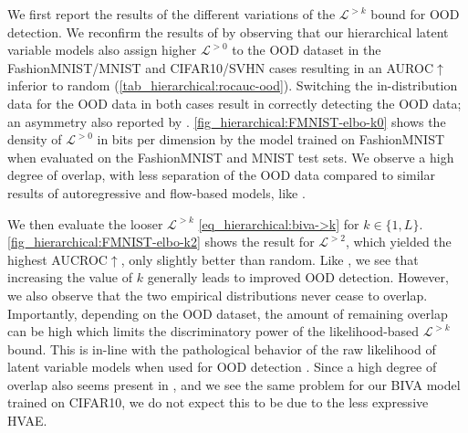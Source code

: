 {We first report the results of the different variations of the $\mathcal{L}^{>k}$ bound for OOD detection. 
We reconfirm the results of \textcite{nalisnick_deep_2019} by observing that our hierarchical latent variable models also assign higher $\mathcal{L}^{>0}$ to the OOD dataset in the FashionMNIST/MNIST and CIFAR10/SVHN cases resulting in an AUROC$\uparrow$ inferior to random (\cref{tab_hierarchical:rocauc-ood}).
Switching the in-distribution data for the OOD data in both cases result in correctly detecting the OOD data; an asymmetry also reported by \textcite{nalisnick_deep_2019}.
\cref{fig_hierarchical:FMNIST-elbo-k0} shows the density of $\mathcal{L}^{>0}$ in bits per dimension \parencite{theis_note_2016} by the model trained on FashionMNIST when evaluated on the FashionMNIST and MNIST test sets.
We observe a high degree of overlap, with less separation of the OOD data compared to similar results of autoregressive and flow-based models, like \textcite{xiao_likelihood_2020}.


We then evaluate the looser $\mathcal{L}^{>k}$ \cref{eq_hierarchical:biva->k} for $k\in\{1,L\}$.
\cref{fig_hierarchical:FMNIST-elbo-k2} shows the result for $\mathcal{L}^{>2}$, which yielded the highest AUCROC$\uparrow$, only slightly better than random.
Like \textcite{maaloe_biva_2019}, we see that increasing the value of $k$ generally leads to improved OOD detection.
However, we also observe that the two empirical distributions never cease to overlap.
Importantly, depending on the OOD dataset, the amount of remaining overlap can be high which limits the discriminatory power of the likelihood-based $\mathcal{L}^{>k}$ bound.
This is in-line with the pathological behavior of the raw likelihood of latent variable models when used for OOD detection \parencite{xiao_likelihood_2020}.
Since a high degree of overlap also seems present in \textcite{maaloe_biva_2019}, and we see the same problem for our BIVA model trained on CIFAR10, we do not expect this to be due to the less expressive HVAE.


}
